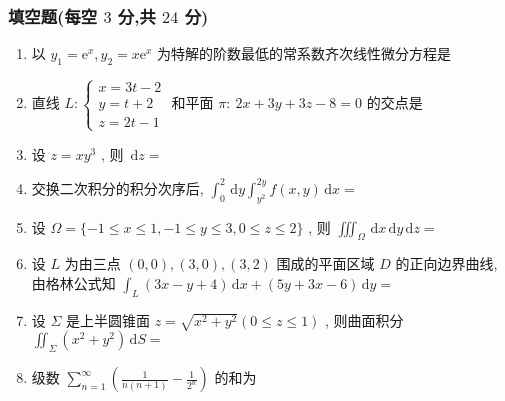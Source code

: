 \documentclass[cn,11pt,fancy,hide]{elegantbook}
\newcommand{\ee}{\mathrm{e}}
\newcommand{\dd}{\,\mathrm{d}}
\renewcommand{\leq}{\leqslant}
\begin{document}
\subsubsection{填空题(每空 $3$ 分,共 $24$ 分)}
\begin{enumerate}
	\item 以 $y_{1}=\ee^{x}, y_{2}=x \ee^{x}$ 为特解的阶数最低的常系数齐次线性微分方程是\underline{\hspace{8pc}}
	
	\item 直线 $L:\begin{cases}
	x=3t-2\\
	y=t+2\\
	z=2t-1
	\end{cases}$ 和平面 $\pi:\ 2 x+3 y+3 z-8=0$ 的交点是\underline{\hspace{8pc}}
	
	\item 设 $z=xy^3$ , 则 $\dd z=$\underline{\hspace{8pc}}
	
	\item 交换二次积分的积分次序后, $\int_{0}^{2} \dd y \int_{y^{2}}^{2 y} f(x, y) \dd x=$\underline{\hspace{8pc}}
	
	\item 设 $\Omega=\{-1 \leq x \leq 1,-1 \leq y \leq 3,0 \leq z \leq 2\}$ , 则 $\iiint_{\Omega} \dd x \dd y \dd z=$\underline{\hspace{8pc}}
	
	\item 设 $L$ 为由三点 $(0,0),(3,0),(3,2)$ 围成的平面区域 $D$ 的正向边界曲线, 由格林公式知 $\int_{L}(3 x-y+4) \dd x+(5 y+3 x-6) \dd y=$\underline{\hspace{8pc}}
	
	\item 设 $\Sigma$ 是上半圆锥面 $z=\sqrt{x^{2}+y^{2}}(0 \leq z \leq 1)$ , 则曲面积分 $\iint_{\Sigma}\left(x^2+y^2\right)\dd S=$\underline{\hspace{8pc}}
	
	\item 级数 $\sum_{n=1}^{\infty}\left(\frac{1}{n(n+1)}-\frac{1}{2^{n}}\right)$ 的和为\underline{\hspace{8pc}}
\end{enumerate}
\end{document}
